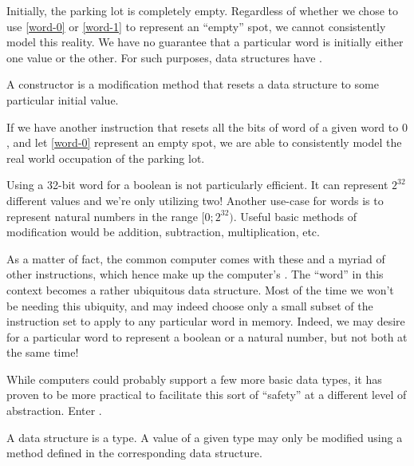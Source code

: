 Initially, the parking lot is completely empty. Regardless of whether we chose
to use \ref{word-0} or \ref{word-1} to represent an ``empty'' spot, we cannot
consistently model this reality. We have no guarantee that a particular word is
initially either one value or the other. For such purposes, data structures
have .

\begin{definition}

A constructor is a modification method that resets a data structure to some
particular initial value.

\end{definition}

If we have another instruction that resets all the bits of word of a given word
to $0$, and let \ref{word-0} represent an empty spot, we are able to
consistently model the real world occupation of the parking lot.


Using a 32-bit word for a boolean is not particularly efficient. It can
represent $2^{32}$ different values and we're only utilizing two\footnotemark!
Another use-case for words is to represent natural numbers in the range
$[0;2^{32})$.  Useful basic methods of modification would be addition,
subtraction, multiplication, etc.


As a matter of fact, the common computer comes with these and a myriad of other
instructions, which hence make up the computer's . The
``word'' in this context becomes a rather ubiquitous data structure. Most of
the time we won't be needing this ubiquity, and may indeed choose only a small
subset of the instruction set to apply to any particular word in memory.
Indeed, we may desire for a particular word to represent a boolean or a natural
number, but not both at the same time!

While computers could probably support a few more basic data types, it has
proven to be more practical to facilitate this sort of ``safety'' at a
different level of abstraction. Enter .

\begin{definition}

A data structure is a type. A value of a given type may only be modified using
a method defined in the corresponding data structure.

\end{definition}

